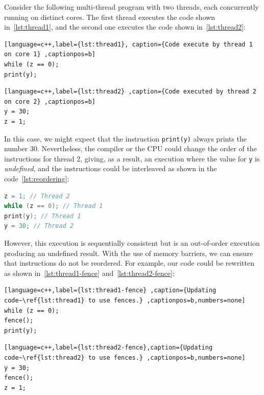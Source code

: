 \begin{example}
\label{ex:reordering}
Consider the following multi-thread program with two threads, each concurrently running on distinct cores. The first thread executes the code shown in~\ref{lst:thread1}, and the second one executes the code shown in~\ref{lst:thread2}:

\begin{lstlisting}[language=c++,label={lst:thread1}, caption={Code execute by thread 1 on core 1} ,captionpos=b]
while (z == 0);
print(y);
\end{lstlisting}

\begin{lstlisting}[language=c++,label={lst:thread2} ,caption={Code executed by thread 2 on core 2} ,captionpos=b]
y = 30;
z = 1;
\end{lstlisting}


In this case, we might expect that the instruction \texttt{print(y)} always prints the number 30. Nevertheless, the compiler or the CPU could change the order of the instructions for thread 2, giving, as a result, an execution where the value for \texttt{y} is \emph{undefined}, and the instructions could be interleaved as shown in the code~\ref{lst:reordering}:

\begin{lstlisting}[language=c++,label={lst:reordering},caption={Code reordered by CPU}, captionpos=b]
z = 1; // Thread 2
while (z == 0); // Thread 1
print(y); // Thread 1
y = 30; // Thread 2
\end{lstlisting}

However, this execution is sequentially consistent but is an out-of-order execution producing an undefined result. With the use of memory barriers, we can ensure that instructions do not be reordered. For example, our code could be rewritten as shown in~\ref{lst:thread1-fence} and~\ref{lst:thread2-fence}:

\begin{lstlisting}[language=c++,label={lst:thread1-fence} ,caption={Updating code~\ref{lst:thread1} to use fences.} ,captionpos=b,numbers=none]
while (z == 0);
fence();
print(y);
\end{lstlisting}

\begin{lstlisting}[language=c++,label={lst:thread2-fence},caption={Updating code~\ref{lst:thread2} to use fences.} ,captionpos=b,numbers=none]
y = 30;
fence();
z = 1;
\end{lstlisting}

\end{example}

